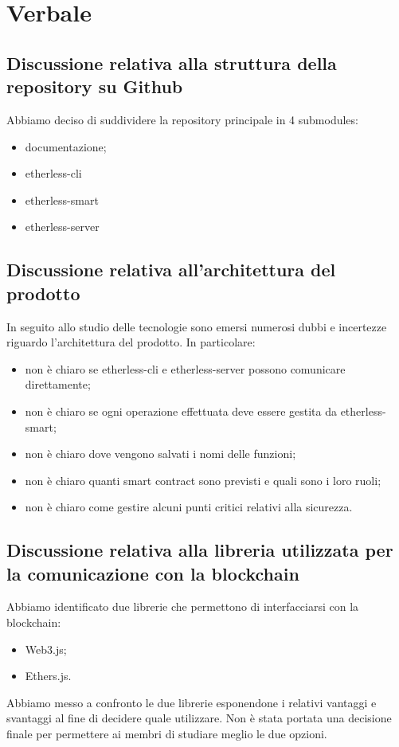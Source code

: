 \section{Verbale}

	\subsection{Discussione relativa alla struttura della repository su Github}
	Abbiamo deciso di suddividere la repository principale in 4 submodules:
	\begin{itemize}
		\item documentazione;
		\item etherless-cli
		\item etherless-smart
		\item etherless-server
	\end{itemize}
	

	\subsection{Discussione relativa all'architettura del prodotto}
	In seguito allo studio delle tecnologie sono emersi numerosi dubbi e incertezze riguardo l'architettura del prodotto.
	In particolare:
	\begin{itemize}
		\item non è chiaro se etherless-cli e etherless-server possono comunicare direttamente;
		\item non è chiaro se ogni operazione effettuata deve essere gestita da etherless-smart;
		\item non è chiaro dove vengono salvati i nomi delle funzioni;
		\item non è chiaro quanti smart contract sono previsti e quali sono i loro ruoli;
		\item non è chiaro come gestire alcuni punti critici relativi alla sicurezza.
	\end{itemize}

	\subsection{Discussione relativa alla libreria utilizzata per la comunicazione con la blockchain}
	Abbiamo identificato due librerie che permettono di interfacciarsi con la blockchain:
	\begin{itemize}
		\item Web3.js;
		\item Ethers.js.
	\end{itemize}
	Abbiamo messo a confronto le due librerie esponendone i relativi vantaggi e svantaggi al fine di decidere quale utilizzare.
	Non è stata portata una decisione finale per permettere ai membri di studiare meglio le due opzioni.
	
